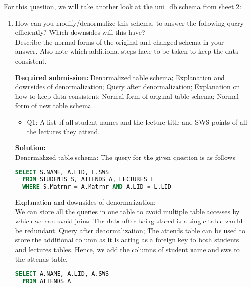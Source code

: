 


\newcommand{\subtitle}{\textbf{Exercise 6}}
\newcommand{\outdate}{27.11.2023}
\newcommand{\duedate}{04.12.2023 12:00 MEZ}
\newcommand{\video}{033}





  For this question, we will take another look at the uni\_db schema from sheet 2:

\begin{enumerate}
\item

  How can you modify/denormalize this schema, to answer the following query efficiently?
  Which downsides will this have?\\
  Describe the normal forms of the original and changed schema in your answer. 
  Also note which additional steps have to be taken to keep the data consistent.

  \textbf{Required submission:} Denormalized table schema; Explanation and downsides of denormalization; Query after denormalization; Explanation on how to keep data consistent; Normal form of original table schema; Normal form of new table schema.

  \begin{itemize}
    \item Q1: A list of all student names and the lecture title and SWS points of all the lectures they attend.
  \end{itemize}

  {\bf Solution:}\\
  Denormalized table schema: The query for the given question is as follows:
  \begin{lstlisting}[language=sql]
  SELECT S.NAME, A.LID, L.SWS 
  FROM STUDENTS S, ATTENDS A, LECTURES L
  WHERE S.Matrnr = A.Matrnr AND A.LID = L.LID
  \end{lstlisting}
  Explanation and downsides of denormalization:\\
	We can store all the queries in one table to avoid multiple table accesses by which we 	can avoid joins. The data after being stored is a single table would be redundant.
	Query after denormalization; 
	The attends table can be used to store the additional column as it is acting as a foreign key to both students and lectures tables. Hence, we add the columns of 
  student name and sws to the attends table.
    
  \begin{lstlisting}[language=sql]
  SELECT A.NAME, A.LID, A.SWS
  FROM ATTENDS A
  \end{lstlisting}


\end{enumerate}
